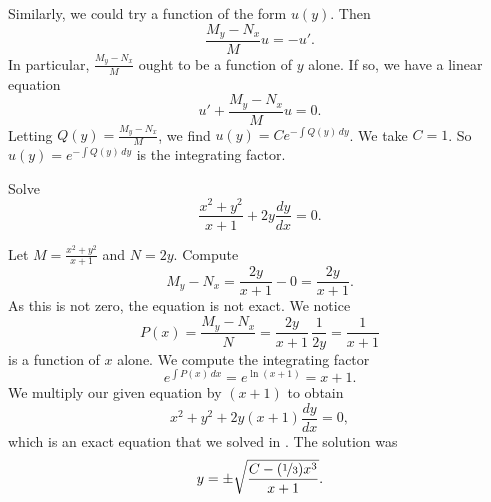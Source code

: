 Similarly, we could try a function of the form $u(y)$.
Then
\begin{equation*}
\frac{M_y-N_x}{M} u = - u' .
\end{equation*}
In particular, $\frac{M_y-N_x}{M}$ ought to be a function of $y$ alone.
If so, we have a linear equation
\begin{equation*}
u' + \frac{M_y-N_x}{M} u = 0 .
\end{equation*}
Letting $Q(y) = \frac{M_y-N_x}{M}$,
we find $u(y) = C e^{-\int Q(y) \, dy}$.  We
take $C=1$.  So $u(y) = e^{-\int Q(y) \, dy}$ is the integrating factor.

\begin{example}
Solve
\begin{equation*}
\frac{x^2+y^2}{x+1} + 2y \frac{dy}{dx} = 0 .
\end{equation*}

Let $M= \frac{x^2+y^2}{x+1}$ and $N=2y$.
Compute
\begin{equation*}
M_y-N_x = \frac{2y}{x+1} - 0 = \frac{2y}{x+1} .
\end{equation*}
As this is not zero, the equation is not exact.  We notice
\begin{equation*}
P(x) = \frac{M_y-N_x}{N} = \frac{2y}{x+1} \, \frac{1}{2y} = \frac{1}{x+1}
\end{equation*}
is a function of $x$ alone.    We compute the integrating factor
\begin{equation*}
e^{\int  P(x) \, dx}
=
e^{\ln (x+1)} = x+1 .
\end{equation*}
We multiply our given equation by $(x+1)$ to obtain
\begin{equation*}
x^2+y^2 + 2y(x+1) \frac{dy}{dx} = 0 ,
\end{equation*}
which is an exact equation that we solved in
.  The solution was
\begin{equation*}
y = \pm \sqrt{\frac{C-(\nicefrac{1}{3})x^3}{x+1}} .
\end{equation*}
\end{example}

